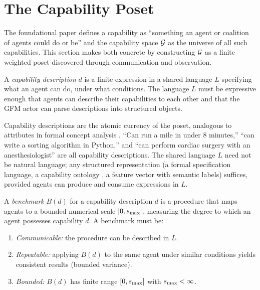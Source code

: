 \section{The Capability Poset}
\label{sec:poset}

The foundational paper defines a capability as ``something an agent or
coalition of agents could do or be'' and the capability space $\mathcal{G}$ as the
universe of all such capabilities. This section makes both concrete by
constructing $\mathcal{G}$ as a finite weighted poset
\citep{davey2002introduction} discovered through communication and observation.


\begin{definition}
\label{def:capability_description}
A \emph{capability description} $d$ is a finite expression in a shared
    language $L$ specifying what an agent can do, under what conditions. The
    language $L$ must be expressive enough that agents can describe their
    capabilities to each other and that the GFM actor can parse descriptions
    into structured objects.
\end{definition}

Capability descriptions are the atomic currency of the poset, analogous to
attributes in formal concept analysis \citep{ganter1999formal}. ``Can run a
mile in under 8 minutes,'' ``can write a sorting algorithm in Python,'' and
``can perform cardiac surgery with an anesthesiologist'' are all capability
descriptions. The shared language $L$ need not be natural language; any
structured representation (a formal specification language, a capability
ontology \citep{gruber1993translation}, a feature vector with semantic labels)
suffices, provided agents can
produce and consume expressions in $L$.

\begin{definition}[Benchmark]
\label{def:benchmark}
A \emph{benchmark} $B(d)$ for a capability description $d$ is a procedure
    that maps agents to a bounded numerical scale $[0, s_{\mathrm{max}}]$, measuring the
    degree to which an agent possesses capability $d$. A benchmark must be:
\begin{enumerate}
\item[\textbf{(B1)}] \emph{Communicable:} the procedure can be described in $L$.
\item[\textbf{(B2)}] \emph{Repeatable:} applying $B(d)$ to the same agent
    under similar conditions yields consistent results (bounded variance).
\item[\textbf{(B3)}] \emph{Bounded:} $B(d)$ has finite range $[0, s_{\mathrm{max}}]$ with
    $s_{\mathrm{max}} < \infty$.
\end{enumerate}
\end{definition}

